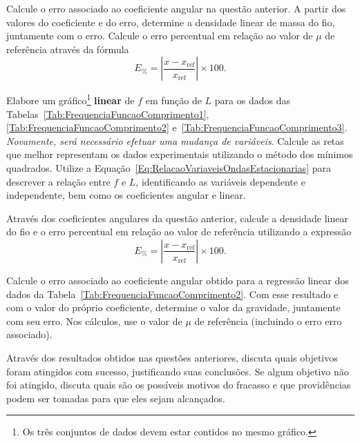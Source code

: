 \begin{question}[type={exam}]{1.5}
Calcule o erro associado ao coeficiente angular na questão anterior. A partir dos valores do coeficiente e do erro, determine a densidade linear de massa do fio, juntamente com o erro. Calcule o erro percentual em relação ao valor de $\mu$ de referência através da fórmula
\begin{equation}
	E_{\%} = \left|\frac{x-x_{\textrm{ref}}}{x_{\textrm{ref}}}\right| \times 100.
\end{equation}
\end{question}

\begin{question}[type={exam}]{1.5}
Elabore um gráfico\footnote{Os três conjuntos de dados devem estar contidos no mesmo gráfico.} \textbf{linear} de $f$ em função de $L$ para os dados das Tabelas~\ref{Tab:FrequenciaFuncaoComprimento1}, \ref{Tab:FrequenciaFuncaoComprimento2} e~\ref{Tab:FrequenciaFuncaoComprimento3}. \emph{Novamente, será necessário efetuar uma mudança de variáveis}. Calcule as retas que melhor representam os dados experimentais utilizando o método dos mínimos quadrados. Utilize a Equação~\eqref{Eq:RelacaoVariaveisOndasEstacionarias} para descrever a relação entre $f$ e $L$, identificando as variáveis dependente e independente, bem como os coeficientes angular e linear.
\end{question}

\begin{question}[type={exam}]{1}
Através dos coeficientes angulares da questão anterior, calcule a densidade linear do fio e o erro percentual em relação ao valor de referência utilizando a expressão 
\begin{equation}
	E_{\%} = \left|\frac{x-x_{\textrm{ref}}}{x_{\textrm{ref}}}\right| \times 100.
\end{equation}
\end{question}

\begin{question}[type={exam}]{1}
Calcule o erro associado ao coeficiente angular obtido para a regressão linear dos dados da Tabela~\ref{Tab:FrequenciaFuncaoComprimento2}. Com esse resultado e com o valor do próprio coeficiente, determine o valor da gravidade, juntamente com seu erro. Nos cálculos, use o valor de $\mu$ de referência (incluindo o erro erro associado).
\end{question}

\begin{question}[type={exam}]{1.5}
Através dos resultados obtidos nas questões anteriores, discuta quais objetivos foram atingidos com sucesso, justificando suas conclusões. Se algum objetivo não foi atingido, discuta quais são os possíveis motivos do fracasso e que providências podem ser tomadas para que eles sejam alcançados.
\end{question}

